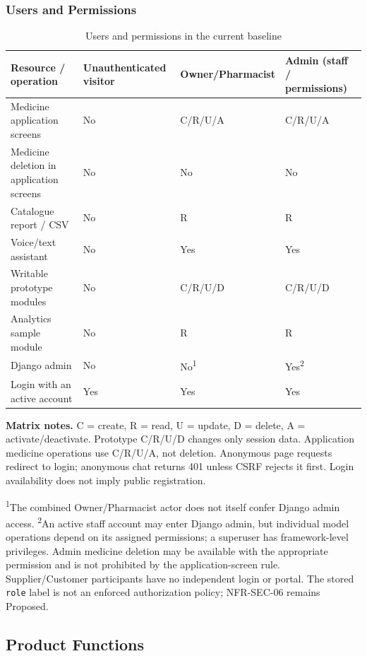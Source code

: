 \documentclass[11pt,a4paper]{article}
\begin{document}
\subsubsection{Users and Permissions}
\begin{table}[H]\centering\small
\caption{Users and permissions in the current baseline}\label{tab:permissions}
\begin{tabularx}{\textwidth}{@{}L{56mm}YYY@{}}
\toprule Resource / operation & Unauthenticated visitor & Owner/Pharmacist & Admin (staff / permissions)\\\midrule
Medicine application screens & No & C/R/U/A & C/R/U/A\\
Medicine deletion in application screens & No & No & No\\
Catalogue report / CSV & No & R & R\\
Voice/text assistant & No & Yes & Yes\\
Writable prototype modules & No & C/R/U/D & C/R/U/D\\
Analytics sample module & No & R & R\\
Django admin & No & No\textsuperscript{1} & Yes\textsuperscript{2}\\
Login with an active account & Yes & Yes & Yes\\
\bottomrule\end{tabularx}
\end{table}
\textbf{Matrix notes.} C = create, R = read, U = update, D = delete, A = activate/deactivate. Prototype C/R/U/D changes only session data. Application medicine operations use C/R/U/A, not deletion. Anonymous page requests redirect to login; anonymous chat returns 401 unless CSRF rejects it first. Login availability does not imply public registration.

\textsuperscript{1}The combined Owner/Pharmacist actor does not itself confer Django admin access. \textsuperscript{2}An active staff account may enter Django admin, but individual model operations depend on its assigned permissions; a superuser has framework-level privileges. Admin medicine deletion may be available with the appropriate permission and is not prohibited by the application-screen rule. Supplier/Customer participants have no independent login or portal. The stored \texttt{role} label is not an enforced authorization policy; NFR-SEC-06 remains Proposed.

\subsection{Product Functions}
\end{document}
